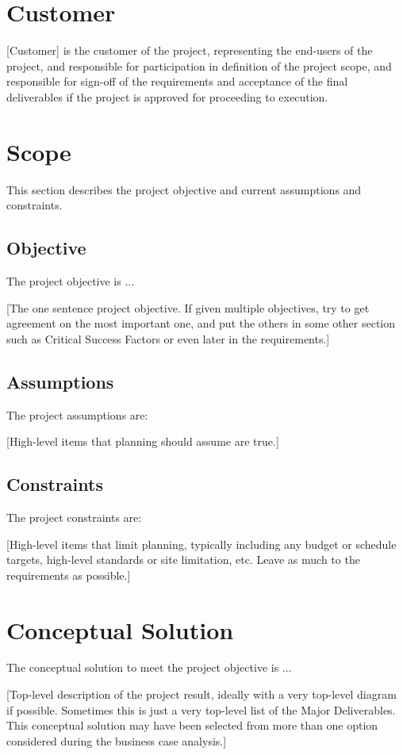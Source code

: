 \documentclass[11pt,letterpaper]{article}
\begin{document}
\section{Customer}
 [Customer] is the customer of the project, representing the end-users of the project, and responsible for participation in definition of the project scope, and responsible for sign-off of the requirements and acceptance of the final deliverables if the project is approved for proceeding to execution.

\section{Scope}
This section describes the project objective and current assumptions and constraints.

\subsection{Objective}
The project objective is ...

    [The one sentence project objective.  If given multiple objectives, try to get agreement on the most important one, and put the others in some other section such as Critical Success Factors or even later in the requirements.]

\subsection{Assumptions}
The project assumptions are:

[High-level items that planning should assume are true.]

\subsection{Constraints}
The project constraints are:

[High-level items that limit planning, typically including any budget or schedule targets, high-level standards or site limitation, etc.  Leave as much to the requirements as possible.]

\section{Conceptual Solution}
The conceptual solution to meet the project objective is ...

    [Top-level description of the project result, ideally with a very top-level diagram if possible.  Sometimes this is just a very top-level list of the Major Deliverables.  This conceptual solution may have been selected from more than one option considered during the business case analysis.]
\end{document}
